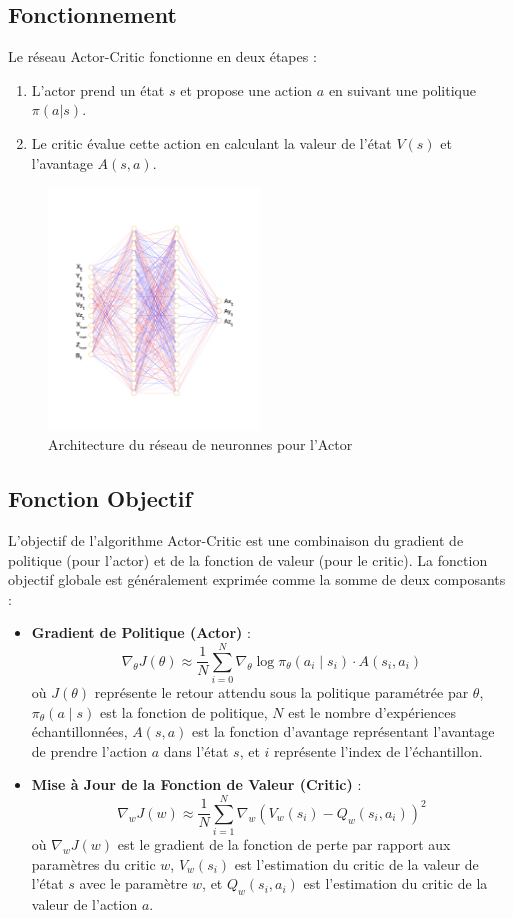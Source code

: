 \documentclass[a4paper, 12pt]{article}
\begin{document}
\subsection{Fonctionnement}
Le réseau Actor-Critic fonctionne en deux étapes :
\begin{enumerate}
    \item L'actor prend un état $s$ et propose une action $a$ en suivant une politique $\pi(a|s)$.
    \item Le critic évalue cette action en calculant la valeur de l'état $V(s)$ et l'avantage $A(s, a)$.
\end{enumerate}
\begin{figure}[h]
    \centering
    \includegraphics[width=0.5\textwidth]{actor_cnn.png}
    \caption{Architecture du réseau de neuronnes pour l'Actor}
    \label{fig:actor-critic}
\end{figure}

\subsection{Fonction Objectif}
L'objectif de l'algorithme Actor-Critic est une combinaison du gradient de politique (pour l'actor) et de la fonction de valeur (pour le critic). La fonction objectif globale est généralement exprimée comme la somme de deux composants :
\begin{itemize}
    \item \textbf{Gradient de Politique (Actor)} :
    \[
    \nabla_\theta J(\theta) \approx \frac{1}{N} \sum_{i=0}^{N} \nabla_\theta \log \pi_\theta(a_i \mid s_i) \cdot A(s_i, a_i)
    \]
    où $J(\theta)$ représente le retour attendu sous la politique paramétrée par $\theta$, $\pi_\theta(a \mid s)$ est la fonction de politique, $N$ est le nombre d'expériences échantillonnées, $A(s, a)$ est la fonction d'avantage représentant l'avantage de prendre l'action $a$ dans l'état $s$, et $i$ représente l'index de l'échantillon.
    \item \textbf{Mise à Jour de la Fonction de Valeur (Critic)} :
    \[
    \nabla_w J(w) \approx \frac{1}{N} \sum_{i=1}^{N} \nabla_w (V_w(s_i) - Q_w(s_i, a_i))^2
    \]
    où $\nabla_w J(w)$ est le gradient de la fonction de perte par rapport aux paramètres du critic $w$, $V_w(s_i)$ est l'estimation du critic de la valeur de l'état $s$ avec le paramètre $w$, et $Q_w(s_i, a_i)$ est l'estimation du critic de la valeur de l'action $a$.
\end{itemize}
\end{document}

